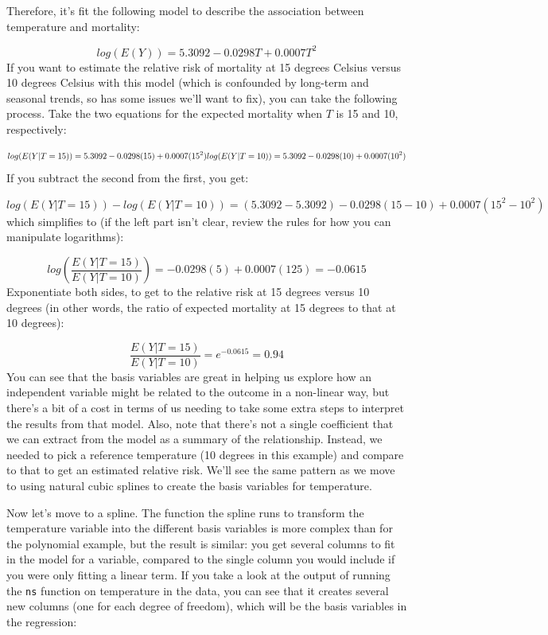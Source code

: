 \documentclass[
]{book}
\begin{document}
Therefore, it's fit the following model to describe the association between temperature and
mortality:

\[
log(E(Y)) = 5.3092 - 0.0298T + 0.0007T^2
\]
If you want to estimate the relative risk of mortality at 15 degrees Celsius versus 10
degrees Celsius with this model (which is confounded by long-term and seasonal trends, so
has some issues we'll want to fix), you can take the following process. Take the two
equations for the expected mortality when \(T\) is 15 and 10, respectively:

\[
log(E(Y|T=15)) = 5.3092 - 0.0298(15) + 0.0007(15^2) \\
log(E(Y|T=10)) = 5.3092 - 0.0298(10) + 0.0007(10^2)  
\]
If you subtract the second from the first, you get:

\[
log(E(Y|T=15)) - log(E(Y|T=10)) = (5.3092 - 5.3092) - 0.0298(15 - 10) + 0.0007(15^2 - 10^2)
\]
which simplifies to (if the left part isn't clear, review the rules for how you can manipulate
logarithms):

\[
log(\frac{E(Y|T=15)}{E(Y|T=10)}) = - 0.0298(5) + 0.0007(125) = -0.0615
\]
Exponentiate both sides, to get to the relative risk at 15 degrees versus 10 degrees (in
other words, the ratio of expected mortality at 15 degrees to that at 10 degrees):

\[
\frac{E(Y|T=15)}{E(Y|T=10)} = e^{-0.0615} =  0.94
\]
You can see that the basis variables are great in helping us explore how an independent
variable might be related to the outcome in a non-linear way, but there's a bit of a cost
in terms of us needing to take some extra steps to interpret the results from that model.
Also, note that there's not a single coefficient that we can extract from the model as
a summary of the relationship. Instead, we needed to pick a reference temperature (10 degrees
in this example) and compare to that to get an estimated relative risk. We'll see the
same pattern as we move to using natural cubic splines to create the basis variables for
temperature.

Now let's move to a spline. The function the spline runs to transform the temperature
variable into the different basis variables is more complex than for the polynomial example,
but the result is similar: you get several columns to fit in the model for a variable, compared
to the single column you would include if you were only fitting a linear term. If you
take a look at the output of running the \texttt{ns} function on temperature in the data, you can
see that it creates several new columns (one for each degree of freedom), which will be the
basis variables in the regression:
\end{document}
